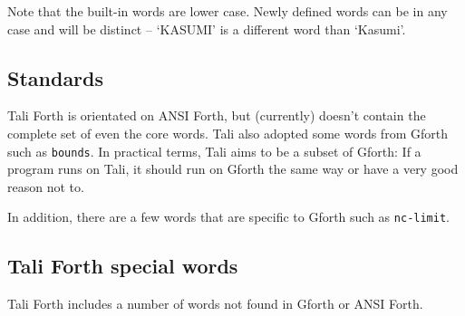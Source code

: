 Note that the built-in words are lower case. Newly defined
words can be in any case and will be distinct -- `KASUMI' is a different word
than `Kasumi'.


\subsection{Standards}

Tali Forth is orientated on ANSI Forth, but (currently) doesn't contain the
complete set of even the core words. Tali also adopted some words from
Gforth such as \texttt{bounds}. In
practical terms, Tali aims to be a subset of Gforth: If a program runs on Tali,
it should run on Gforth the same way or have a very good reason not to. 

In addition, there are a few words that are specific to Gforth such as 
\texttt{nc-limit}. 


\subsection{Tali Forth special words}

Tali Forth includes a number of words not found in Gforth or ANSI Forth. 

